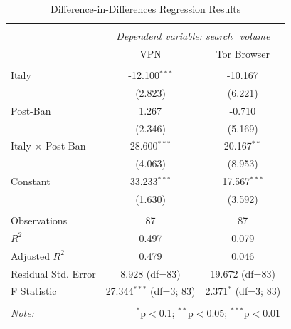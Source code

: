 \begin{table}[htbp]
\centering
\caption{Difference-in-Differences Regression Results}
\label{tab:circumvention-regression}
\begin{tabular}{@{\extracolsep{5pt}}lcc}
\\[-1.8ex]\hline
\hline \\[-1.8ex]
& \multicolumn{2}{c}{\textit{Dependent variable: search\_volume}} \
\cr \cline{2-3}
\\[-1.8ex] & \multicolumn{1}{c}{VPN} & \multicolumn{1}{c}{Tor Browser}  \\
\hline \\[-1.8ex]
 Italy & -12.100$^{***}$ & -10.167$^{}$ \\
& (2.823) & (6.221) \\
 Post-Ban & 1.267$^{}$ & -0.710$^{}$ \\
& (2.346) & (5.169) \\
 Italy × Post-Ban & 28.600$^{***}$ & 20.167$^{**}$ \\
& (4.063) & (8.953) \\
 Constant & 33.233$^{***}$ & 17.567$^{***}$ \\
& (1.630) & (3.592) \\
\hline \\[-1.8ex]
 Observations & 87 & 87 \\
 $R^2$ & 0.497 & 0.079 \\
 Adjusted $R^2$ & 0.479 & 0.046 \\
 Residual Std. Error & 8.928 (df=83) & 19.672 (df=83) \\
 F Statistic & 27.344$^{***}$ (df=3; 83) & 2.371$^{*}$ (df=3; 83) \\
\hline
\hline \\[-1.8ex]
\textit{Note:} & \multicolumn{2}{r}{$^{*}$p$<$0.1; $^{**}$p$<$0.05; $^{***}$p$<$0.01} \\
\end{tabular}
\end{table}
